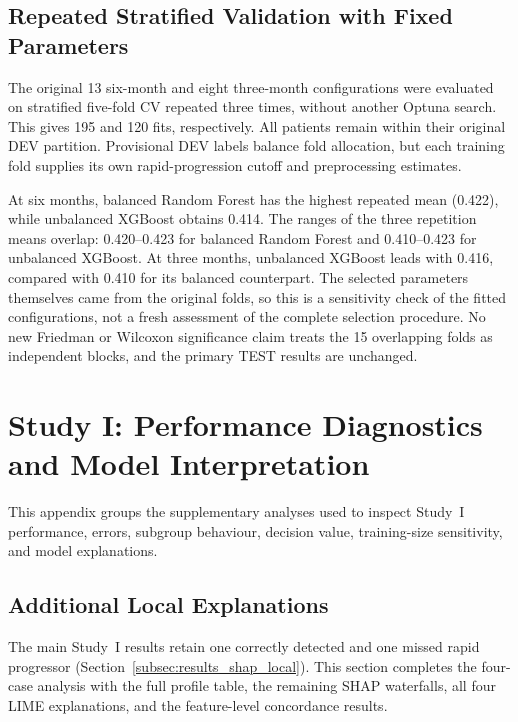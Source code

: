 \section{Repeated Stratified Validation with Fixed Parameters}
\label{app:review_s1_repeated}

The original 13 six-month and eight three-month configurations were evaluated on stratified five-fold CV repeated three times, without another Optuna search. This gives 195 and 120 fits, respectively. All patients remain within their original DEV partition. Provisional DEV labels balance fold allocation, but each training fold supplies its own rapid-progression cutoff and preprocessing estimates.



At six months, balanced Random Forest has the highest repeated mean (0.422), while unbalanced XGBoost obtains 0.414. The ranges of the three repetition means overlap: 0.420--0.423 for balanced Random Forest and 0.410--0.423 for unbalanced XGBoost. At three months, unbalanced XGBoost leads with 0.416, compared with 0.410 for its balanced counterpart. The selected parameters themselves came from the original folds, so this is a sensitivity check of the fitted configurations, not a fresh assessment of the complete selection procedure. No new Friedman or Wilcoxon significance claim treats the 15 overlapping folds as independent blocks, and the primary TEST results are unchanged.

\chapter{Study I: Performance Diagnostics and Model Interpretation}
\label{app:study1_diagnostics}

This appendix groups the supplementary analyses used to inspect Study~I performance, errors, subgroup behaviour, decision value, training-size sensitivity, and model explanations.

\section{Additional Local Explanations}
\label{app:local_explanations}

The main Study~I results retain one correctly detected and one missed rapid progressor (Section~\ref{subsec:results_shap_local}). This section completes the four-case analysis with the full profile table, the remaining SHAP waterfalls, all four LIME explanations, and the feature-level concordance results.

